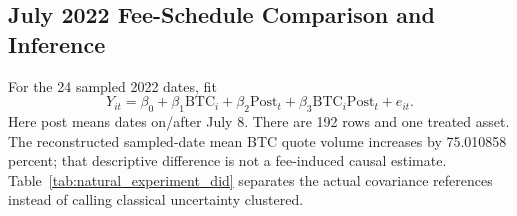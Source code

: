 \documentclass[12pt]{article}
\theoremstyle{definition}
\theoremstyle{remark}
\begin{document}
\subsection{July 2022 Fee-Schedule Comparison and Inference}
For the 24 sampled 2022 dates, fit \[Y_{it}=\beta_0+\beta_1\mathrm{BTC}_i+\beta_2\mathrm{Post}_t+\beta_3\mathrm{BTC}_i\mathrm{Post}_t+e_{it}.\] Here post means dates on/after July 8. There are 192 rows and one treated asset. The reconstructed sampled-date mean BTC quote volume increases by 75.010858 percent; that descriptive difference is not a fee-induced causal estimate. Table~\ref{tab:natural_experiment_did} separates the actual covariance references instead of calling classical uncertainty clustered.
\begin{table}[htbp]
\centering\footnotesize\setlength{\tabcolsep}{3pt}
\caption{Recomputed BTC-by-post association in the original 192-unit 2022 panel. The same four-regressor specification is evaluated under three covariance references; cluster counts are eight assets and 24 sampled dates. The assignment is not randomized.}
\label{tab:natural_experiment_did}
\end{table}
\end{document}
